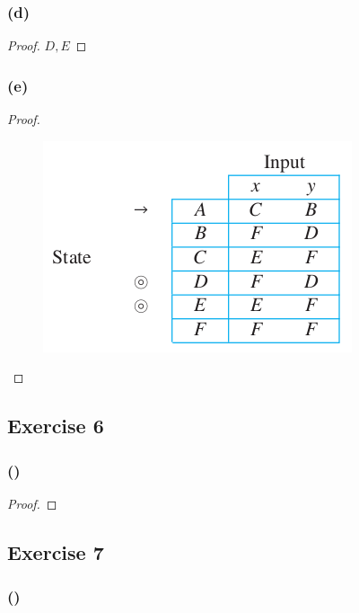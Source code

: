 \documentclass[14pt]{extarticle}
\begin{document}
\subsubsection{(d)}

\begin{proof}
\(D, E\)
\end{proof}

\subsubsection{(e)}

\begin{proof}
\begin{figure}[ht!]
\centering
\includegraphics[scale=0.5]{../images/12.2.5.e.png}
\end{figure}
\end{proof}

\subsection{Exercise 6}

\subsubsection{()}

\begin{proof}

\end{proof}

\subsection{Exercise 7}

\subsubsection{()}
\end{document}

